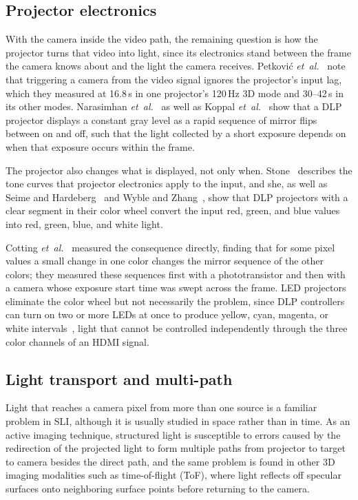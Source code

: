 \documentclass[10pt,journal,compsoc]{IEEEtran}
\newcommand{\SI}[2]{#1\,#2}
\newcommand{\second}{s}\newcommand{\hertz}{Hz}\newcommand{\metre}{m}
\begin{document}
\subsection{Projector electronics}
\label{sec:rw_electronics}
With the camera inside the video path, the remaining question is how the projector turns that
video into light, since its electronics stand between the frame the camera knows about and the
light the camera receives. Petkovi\'c \emph{et~al.}~\cite{petkovic2016software} note that
triggering a camera from the video signal ignores the projector's input lag, which they measured
at \SI{16.8}{\milli\second} in one projector's \SI{120}{\hertz} 3D mode and 30--\SI{42}{\milli\second}
in its other modes. Narasimhan \emph{et~al.}~\cite{narasimhan2008dithering} as well as Koppal
\emph{et~al.}~\cite{koppal2012dlp} show that a DLP projector displays a constant gray level as a
rapid sequence of mirror flips between on and off, such that the light collected by a short
exposure depends on when that exposure occurs within the frame.

The projector also changes what is displayed, not only when. Stone~\cite{stone2001color}
describes the tone curves that projector electronics apply to the input, and she, as well as
Seime and Hardeberg~\cite{seime2003colorimetric} and Wyble and Zhang~\cite{wyble2003dlp}, show that
DLP projectors with a clear segment in their color wheel convert the input red, green, and blue
values into red, green, blue, and white light.

Cotting \emph{et~al.}~\cite{cotting2004embedding} measured the consequence directly, finding that
for some pixel values a small change in one color changes the mirror sequence of the other
colors; they measured these sequences first with a phototransistor and then with a camera whose
exposure start time was swept across the frame. LED projectors eliminate the color wheel but not
necessarily the problem, since DLP controllers can turn on two or more LEDs at once to produce
yellow, cyan, magenta, or white intervals~\cite{ti_dlpa038}, light that cannot be controlled
independently through the three color channels of an HDMI signal.

\subsection{Light transport and multi-path}
Light that reaches a camera pixel from more than one source is a familiar problem in SLI,
although it is usually studied in space rather than in time. As an active imaging technique,
structured light is susceptible to errors caused by the redirection of the projected light to
form multiple paths from projector to target to camera besides the direct path, and the same
problem is found in other 3D imaging modalities such as time-of-flight (ToF), where light reflects
off specular surfaces onto neighboring surface points before returning to the camera.
\end{document}
